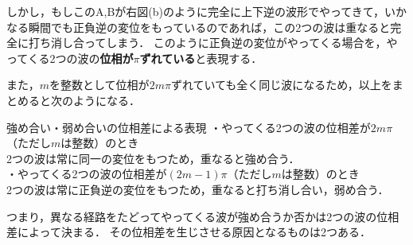  しかし，もしこのA,Bが右図(b)のように完全に上下逆の波形でやってきて，いかなる瞬間でも正負逆の変位をもっているのであれば，この2つの波は重なると完全に打ち消し合ってしまう．
 このように正負逆の変位がやってくる場合を，やってくる2つの波の{\bf 位相が$\pi$ずれている}と表現する．
 
 また，$m$を整数として位相が$2m\pi$ずれていても全く同じ波になるため，以上をまとめると次のようになる．
 
  \begin{matome}{強め合い・弱め合いの位相差による表現}
・やってくる2つの波の位相差が$2m\pi$（ただし$m$は整数）のとき\\
 \hspace{3mm} 2つの波は常に同一の変位をもつため，重なると強め合う．\\
・やってくる2つの波の位相差が$(2m-1)\pi$（ただし$m$は整数）のとき\\
 \hspace{3mm} 2つの波は常に正負逆の変位をもつため，重なると打ち消し合い，弱め合う． 
 \end{matome}
 
 つまり，異なる経路をたどってやってくる波が強め合うか否かは2つの波の位相差によって決まる．
 その位相差を生じさせる原因となるものは2つある．
 
